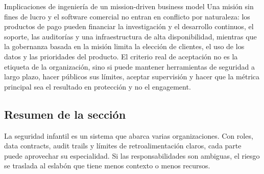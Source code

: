 \begin{importantbox}{Implicaciones de ingeniería de un mission-driven business model}
Una misión sin fines de lucro y el software comercial no entran en conflicto por naturaleza: los productos de pago pueden financiar la investigación y el desarrollo continuos, el soporte, las auditorías y una infraestructura de alta disponibilidad, mientras que la gobernanza basada en la misión limita la elección de clientes, el uso de los datos y las prioridades del producto. El criterio real de aceptación no es la etiqueta de la organización, sino si puede mantener herramientas de seguridad a largo plazo, hacer públicos sus límites, aceptar supervisión y hacer que la métrica principal sea el resultado en protección y no el engagement.
\end{importantbox}


\subsection{Resumen de la sección}

La seguridad infantil es un sistema que abarca varias organizaciones. Con roles, data contracts, audit trails y límites de retroalimentación claros, cada parte puede aprovechar su especialidad. Si las responsabilidades son ambiguas, el riesgo se traslada al eslabón que tiene menos contexto o menos recursos.
